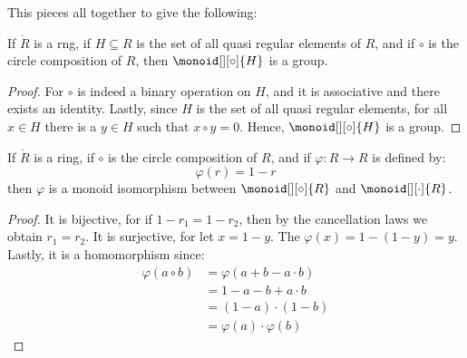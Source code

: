 \documentclass{article}                                                        %
\begin{document}
                This pieces all together to give the following:
                \begin{theorem}
                    If $\ring{R}$ is a rng, if $H\subseteq{R}$ is the set of all
                    quasi regular elements of $R$, and if $\circ$ is the
                    circle composition of $R$, then $\monoid[][\circ]{H}$ is a
                    group.
                \end{theorem}
                \begin{proof}
                    For $\circ$ is indeed a binary operation on $H$, and it is
                    associative and there exists an identity. Lastly, since $H$
                    is the set of all quasi regular elements, for all $x\in{H}$
                    there is a $y\in{H}$ such that $x\circ{y}=0$. Hence,
                    $\monoid[][\circ]{H}$ is a group.
                \end{proof}
                \begin{theorem}
                    If $\ring{R}$ is a ring, if $\circ$ is the circle
                    composition of $R$, and if $\varphi:R\rightarrow{R}$ is
                    defined by:
                    \begin{equation}
                        \varphi(r)=1-r
                    \end{equation}
                    then $\varphi$ is a monoid isomorphism between
                    $\monoid[][\circ]{R}$ and $\monoid[][\cdot]{R}$.
                \end{theorem}
                \begin{proof}
                    It is bijective, for if $1-r_{1}=1-r_{2}$, then by the
                    cancellation laws we obtain $r_{1}=r_{2}$. It is surjective,
                    for let $x=1-y$. The $\varphi(x)=1-(1-y)=y$. Lastly, it is
                    a homomorphism since:
                    \begin{subequations}
                        \begin{align}
                            \varphi(a\circ{b})
                                &=\varphi(a+b-a\cdot{b})\\
                                &=1-a-b+a\cdot{b}\\
                                &=(1-a)\cdot(1-b)\\
                                &=\varphi(a)\cdot\varphi(b)
                        \end{align}
                    \end{subequations}
                \end{proof}
\end{document}
